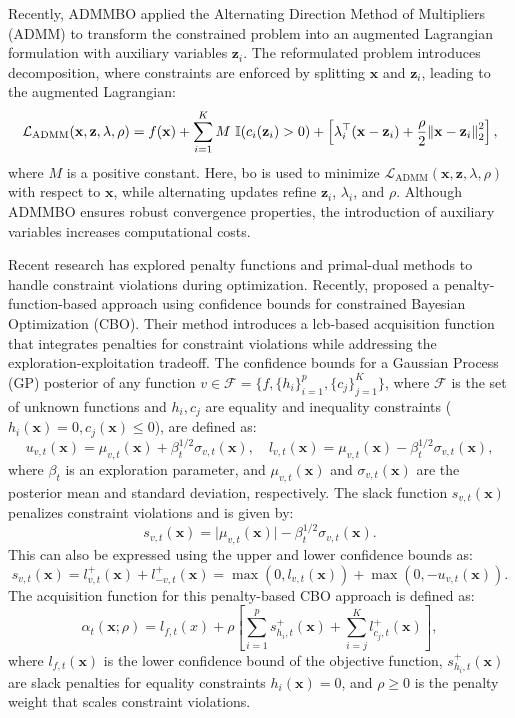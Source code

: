 Recently, ADMMBO \citep{ariafar2019admmbo} applied the Alternating Direction Method of Multipliers (ADMM) to transform the constrained problem into an augmented Lagrangian formulation with auxiliary variables \( \mathbf{z}_i \). The reformulated problem introduces decomposition, where constraints are enforced by splitting \( \mathbf{x} \) and \( \mathbf{z}_i \), leading to the augmented Lagrangian:  
\[
\mathcal{L}_{\text{ADMM}}(\mathbf{x}, \mathbf{z}, \lambda, \rho) = f(\mathbf{x})  + \sum_{i=1}^K M \text{ }   \mathbb{I}(c_i (\mathbf{z}_i) > 0) + \left[ \lambda_i^\top (\mathbf{x} - \mathbf{z}_i) + \frac{\rho}{2} \norm{\mathbf{x} - \mathbf{z}_i}_2^2 \right], 
\]
where $M$ is a positive constant. Here, \ac{bo} is used to minimize \( \mathcal{L}_{\text{ADMM}}(\mathbf{x}, \mathbf{z}, \lambda, \rho) \) with respect to \( \mathbf{x} \), while alternating updates refine \( \mathbf{z}_i \), \( \lambda_i \), and \( \rho \). Although ADMMBO ensures robust convergence properties, the introduction of auxiliary variables increases computational costs.

Recent research has explored penalty functions and primal-dual methods to handle constraint violations during optimization. Recently, \citet{lu2022no} proposed a penalty-function-based approach using confidence bounds for constrained Bayesian Optimization (CBO). Their method introduces a \ac{lcb}-based acquisition function that integrates penalties for constraint violations while addressing the exploration-exploitation tradeoff. The confidence bounds for a Gaussian Process (GP) posterior of any function \( v \in \mathcal{F} = \{f, \{h_i\}_{i=1}^p,  \{c_j\}_{j=1}^K\} \), where \( \mathcal{F} \) is the set of unknown functions and $h_i, c_j$ are equality and inequality constraints ($h_i(\mathbf{x}) = 0, c_j(\mathbf{x}) \le 0$), are defined as:  
\[
u_{v,t}(\mathbf{x}) = \mu_{v,t}(\mathbf{x}) + \beta_t^{1/2} \sigma_{v,t}(\mathbf{x}), \quad 
l_{v,t}(\mathbf{x}) = \mu_{v,t}(\mathbf{x}) - \beta_t^{1/2} \sigma_{v,t}(\mathbf{\mathbf{x}}),
\]
where \( \beta_t \) is an exploration parameter, and \( \mu_{v,t}(\mathbf{x}) \) and \( \sigma_{v,t}(\mathbf{x}) \) are the posterior mean and standard deviation, respectively. The slack function \( s_{v,t}(\mathbf{x}) \) penalizes constraint violations and is given by:  
\[
s_{v,t}(\mathbf{x}) = \lvert \mu_{v,t}(\mathbf{x}) \rvert - \beta_t^{1/2} \sigma_{v,t}(\mathbf{x}).
\]  
This can also be expressed using the upper and lower confidence bounds as:  
\[
s_{v,t}(\mathbf{x}) = l_{v,t}^+(\mathbf{x}) + l_{-v,t}^+(\mathbf{x}) = \max(0, l_{v,t}(\mathbf{x})) + \max(0, -u_{v,t}(\mathbf{x})).
\]  
The acquisition function for this penalty-based CBO approach is defined as:  
\[
\alpha_t(\mathbf{x}; \rho) = l_{f,t}(x) + \rho \left[ \sum_{i=1}^p s_{h_i,t}^+(\mathbf{x}) + \sum_{i=j}^K  l_{c_j,t}^+(\mathbf{x}) \right],
\] 
where \( l_{f,t}(\mathbf{x}) \) is the lower confidence bound of the objective function, \( s_{h_i,t}^+(\mathbf{x}) \) are slack penalties for equality constraints \( h_i(\mathbf{x}) = 0  \), and \( \rho \geq 0 \) is the penalty weight that scales constraint violations. 

